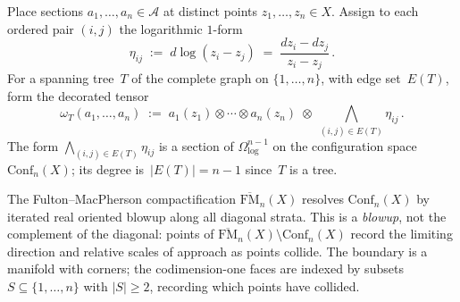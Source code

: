 \documentclass[11pt]{report}
\theoremstyle{definition}
\theoremstyle{remark}
\providecommand{\cA}{\mathcal{A}}
\numberwithin{equation}{section}
\begin{document}
Place sections $a_1,\dots,a_n\in\cA$ at distinct points
$z_1,\dots,z_n\in X$. Assign to each ordered pair $(i,j)$ the
logarithmic $1$-form
\[
\eta_{ij}
\;:=\;
d\log(z_i-z_j)
\;=\;
\frac{dz_i-dz_j}{z_i-z_j}\,.
\]
For a spanning tree~$T$ of the complete graph on $\{1,\dots,n\}$, with edge set~$E(T)$,
form the decorated tensor
\[
\omega_T(a_1,\dots,a_n)
\;:=\;
a_1(z_1)\otimes\cdots\otimes a_n(z_n)
\;\otimes\;
\bigwedge_{(i,j)\in E(T)}\eta_{ij}\,.
\]
The form $\bigwedge_{(i,j)\in E(T)}\eta_{ij}$ is a section of
$\Omega^{n-1}_{\log}$ on the configuration space
$\mathrm{Conf}_n(X)$; its degree is~$|E(T)|=n-1$ since~$T$ is a
tree.

The Fulton--MacPherson compactification
$\overline{\mathrm{FM}}_n(X)$ resolves $\mathrm{Conf}_n(X)$ by
iterated real oriented blowup along all diagonal strata. This is a
\emph{blowup}, not the complement of the diagonal: points of
$\overline{\mathrm{FM}}_n(X)\setminus\mathrm{Conf}_n(X)$ record
the limiting direction and relative scales of approach as
points collide. The boundary is a manifold with corners; the
codimension-one faces are indexed by subsets $S\subseteq\{1,\dots,n\}$
with $|S|\ge 2$, recording which points have collided.
\end{document}
